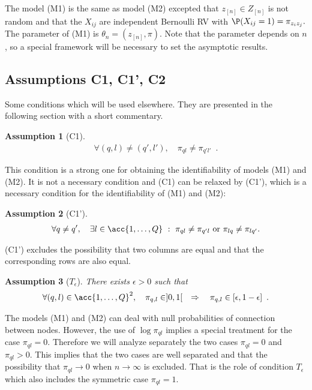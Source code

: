 \documentclass[11pt]{article}
\newtheorem{assum}{Assumption}
\newcommand{\Zn}{Z_{[n]}}
\newcommand{\zn}{z_{[n]}}
\begin{document}
The model (M1) is the same as model (M2) excepted that $\zn \in \Zn$ is not random and that the  $X_{ij}$ are independent Bernoulli RV with $\P(X_{ij}=1)=\pi_{z_iz_j}.$  The parameter of (M1) is $\theta_n=(\zn, \pi)$. Note that the parameter depends on $n$, so a special framework will be necessary to set the asymptotic results.






\subsection{Assumptions C1, C1', C2}
Some conditions which will be used elsewhere. They are presented in the following section with a short commentary.
\begin{assum}[C1]
\label{assum.pi.diff}
\begin{align*}
        \forall (q,l) \ne (q',l'),\quad \pi_{ql} \ne \pi_{q'l'}\enspace.
\end{align*}
\end{assum}
This condition is a strong one for obtaining the identifiability of models (M1) and (M2). It is not a necessary condition and
(C1) can be relaxed by (C1'), which is a necessary condition for the identifiability of (M1) and (M2):
\begin{assum}[C1']
\label{assum.pi.block.diff}
\begin{align*}
        \forall q \ne q', \quad
        \exists l \in \acc{1,\ldots,Q} \ : \ \pi_{ql} \ne \pi_{q'l}\ \mathrm{or}\ \pi_{lq} \ne \pi_{lq'}.
\end{align*}
\end{assum}
(C1') excludes the possibility that two columns are equal and that the corresponding rows are also equal.

\begin{assum}[$T_{\epsilon}$]
\label{assum.pi.trunc}
There exists $\epsilon>0$ such that
\begin{align*}
\forall (q,l) \in \acc{1,\ldots,Q}^2 ,\quad \pi_{q,l}\in]0,1[\quad \Rightarrow\quad \pi_{q,l}\in[\epsilon,1-\epsilon]\enspace.  
\end{align*}
\end{assum}
The models (M1) and (M2) can deal with null probabilities of connection between nodes. However, the use of $\log\pi_{ql}$ implies a special treatment for the case $\pi_{ql}=0.$  Therefore we will analyze separately the two cases $\pi_{ql}=0$  and $\pi_{ql}>0.$ This implies that the two cases are well separated and that the possibility that $\pi_{ql}\rightarrow 0$ when $n \rightarrow \infty$ is excluded. That is the role of condition  $T_{\epsilon}$ which also includes the symmetric case $\pi_{ql}=1.$
\end{document}
